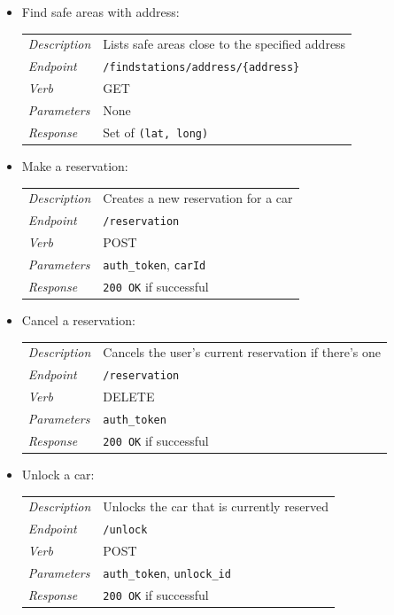 \documentclass[english]{article}
\newcommand{\code}[1]{\texttt{#1}}
\begin{document}
\begin{itemize}
\begin{itemize}
	\item{Find safe areas with address:}\\
	\begin{tabular}{ | l l }
		\textit{Description} & Lists safe areas close to the specified address\\
		\textit{Endpoint} & \code{/findstations/address/\{address\}} \\ 
		\textit{Verb} & GET \\  
		\textit{Parameters} & None \\
		\textit{Response} & Set of \code{(lat, long)}
	\end{tabular}
	
	\item{Make a reservation:}\\
	\begin{tabular}{ | l l }
		\textit{Description} & Creates a new reservation for a car\\
		\textit{Endpoint} & \code{/reservation} \\ 
		\textit{Verb} & POST \\  
		\textit{Parameters} & \code{auth\_token}, \code{carId} \\
		\textit{Response} & \code{200 OK} if successful
	\end{tabular}
	
	\item{Cancel a reservation:}\\
	\begin{tabular}{ | l l }
		\textit{Description} & Cancels the user's current reservation if there's one\\
		\textit{Endpoint} & \code{/reservation} \\ 
		\textit{Verb} & DELETE \\  
		\textit{Parameters} & \code{auth\_token}  \\
		\textit{Response} & \code{200 OK} if successful
	\end{tabular}
	
	\item{Unlock a car:}\\
	\begin{tabular}{ | l l }
		\textit{Description} & Unlocks the car that is currently reserved\\
		\textit{Endpoint} & \code{/unlock} \\ 
		\textit{Verb} & POST \\  
		\textit{Parameters} & \code{auth\_token}, \code{unlock\_id}  \\
		\textit{Response} & \code{200 OK} if successful
	\end{tabular}
	

\end{itemize}
\end{itemize}
\end{document}
